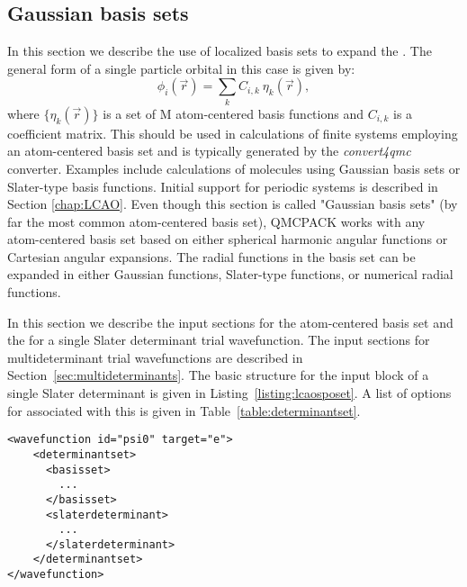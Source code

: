 \subsection{Gaussian basis sets}
\label{sec:gaussianbasis}

In this section we describe the use of localized basis sets to expand the . The general form of a single particle orbital in this case is given by:
\begin{equation}
\phi_i(\vec{r}) = \sum_k C_{i,k} \ \eta_k(\vec{r}),
\end{equation}
where $\{\eta_k(\vec{r})\}$ is a set of M atom-centered basis
functions and $C_{i,k}$ is a coefficient matrix. This 
should be used in calculations of finite systems employing an
atom-centered basis set and is typically generated by the
\textit{convert4qmc} converter.  Examples include calculations of
molecules using Gaussian basis sets or Slater-type basis
functions. Initial support for periodic systems is described in Section
\ref{chap:LCAO}. Even though this section is called "Gaussian basis
sets" (by far the most common atom-centered basis set), QMCPACK works
with any atom-centered basis set based on either spherical
harmonic angular functions or Cartesian angular expansions. The radial
functions in the basis set can be expanded in either Gaussian
functions, Slater-type functions, or numerical radial functions.

In this section we describe the input sections for the atom-centered basis set and the  for a single Slater determinant trial wavefunction. The input sections for multideterminant trial wavefunctions are described in Section~\ref{sec:multideterminants}. The basic structure for the input block of a single Slater determinant is given in Listing~\ref{listing:lcaosposet}.
A list of options for  associated with this  is given in Table~\ref{table:determinantset}.

\begin{minipage}{\linewidth}
\begin{lstlisting}[style=QMCPXML,caption=Basic input block for a single determinant trial wavefunction using a \ixml{sposet} expanded on an atom-centered basis set. \label{listing:lcaosposet}]
<wavefunction id="psi0" target="e">
    <determinantset>
      <basisset>
        ...
      </basisset>
      <slaterdeterminant>
        ...
      </slaterdeterminant>
    </determinantset>    
</wavefunction>
\end{lstlisting}
\end{minipage}

